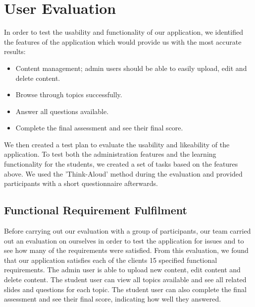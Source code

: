 \documentclass{l3proj}
\begin{document}
\section{User Evaluation}

In order to test the usability and functionality of our application, we identified the features of the application which would provide us with the most accurate results:

\begin{itemize}
\item Content management; admin users should be able to easily upload, edit and delete content.
\item Browse through topics successfully.
\item Answer all questions available.
\item Complete the final assessment and see their final score. 
\end{itemize}

We then created a test plan to evaluate the usability and likeability of the application. To test both the administration features and the learning functionality for the students, we created a set of tasks based on the features above. We used the 'Think-Aloud' method during the evaluation and provided participants with a short questionnaire afterwards.

\subsection{Functional Requirement Fulfilment}

%

Before carrying out our evaluation with a group of participants, our team carried out an evaluation on ourselves in order to test the application for issues and to see how many of the requirements were satisfied. From this evaluation, we found that our application satisfies each of the clients 15 specified functional requirements. The admin user is able to upload new content, edit content and delete content. The student user can view all topics available and see all related slides and questions for each topic. The student user can also complete the final assessment and see their final score, indicating how well they answered.
\end{document}
